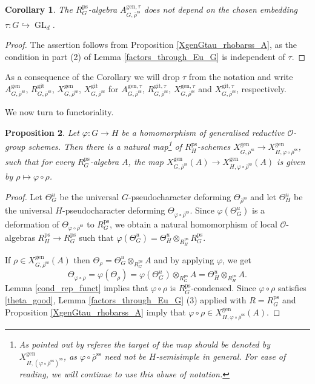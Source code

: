 \documentclass{amsart}
\newtheorem{prop}{Proposition}[section]
\newtheorem{cor}[prop]{Corollary}
\theoremstyle{definition}
\theoremstyle{remark}
\DeclareMathOperator{\GL}{GL}
\newcommand{\OO}{\mathcal O}
\newcommand{\rhobar}{\overline{\rho}}
\newcommand{\ps}{\mathrm{ps}}
\newcommand{\gen}{\mathrm{gen}}
\newcommand{\gps}{\mathrm{git}}
\newcommand{\RpsG}{R^{\ps}_G}
\newcommand{\RpsH}{R^{\ps}_H}
\newcommand{\XgenGrhobarss}{X^{\gen}_{G,\rhobarss}}
\newcommand{\XgenGtaurhobarss}{X^{\gen, \tau}_{G,\rhobarss}}
\newcommand{\rhobarss}{\rhobar^{\mathrm{ss}}}
\begin{document}
\begin{cor}\label{indep_tau} The $\RpsG$-algebra $A^{\gen, \tau}_{G, \rhobarss}$  does not depend on the chosen embedding $\tau: G\hookrightarrow \GL_d$.
\end{cor} 
\begin{proof} The assertion follows from Proposition \ref{XgenGtau_rhobarss_A}, as the condition 
in part (2) of Lemma \ref{factors_through_Eu_G} is independent of $\tau$. 
\end{proof}

 As a consequence of the Corollary we will drop $\tau$ from the notation and write $A^{\gen}_{G, \rhobarss}$, $R^{\gps}_{G, \rhobarss}$,
 $\XgenGrhobarss$, $X^{\gps}_{G, \rhobarss}$ 
 for $A^{\gen,\tau}_{G, \rhobarss}$, $R^{\gps,\tau}_{G, \rhobarss}$, $\XgenGtaurhobarss$ and $X^{\gps,\tau}_{G, \rhobarss}$, respectively.

We now turn to functoriality.

\begin{prop}\label{functoriality_2}
    Let $\varphi : G \to H$ be a homomorphism of generalised reductive $\OO$-group schemes.
    Then there is a natural map\footnote{As pointed out by referee the target of the map should be denoted by $X^{\gen}_{H, (\varphi \circ \rhobarss)^{\mathrm{ss}}}$, as $\varphi\circ \rhobarss$ need not be $H$-semisimple in general. For ease of reading, we will continue to use this abuse of notation.} of $\RpsH$-schemes $\XgenGrhobarss \to X^{\gen}_{H, \varphi \circ \rhobarss}$, such that for every $\RpsG$-algebra $A$, the map $\XgenGrhobarss(A) \to X^{\gen}_{H, \varphi \circ \rhobarss}(A)$ is given by $\rho \mapsto \varphi \circ \rho$.
\end{prop}

\begin{proof} Let $\Theta^u_G$ be the universal $G$-pseudocharacter deforming $\Theta_{\rhobarss}$
and let $\Theta^u_H$ be the universal $H$-pseudocharacter deforming $\Theta_{\varphi\circ\rhobarss}$. 
Since $\varphi(\Theta_G^u)$ is a deformation of $\Theta_{\varphi\circ\rhobarss}$ to $R^{\ps}_G$, we obtain a natural homomorphism of local $\OO$-algebras $R^{\ps}_H \rightarrow R^{\ps}_G$ such that 
$\varphi(\Theta^u_G)= \Theta^u_H \otimes_{R^{\ps}_H} R^{\ps}_G$. 
    
    If $\rho \in \XgenGrhobarss(A)$ then $\Theta_{\rho}= \Theta^u_G \otimes_{R^{\ps}_G} A $ and
    by applying $\varphi$, we get
    \begin{equation}\label{theta_good}
    \Theta_{\varphi \circ \rho}= \varphi(\Theta_{\rho})=\varphi(\Theta^u_G)\otimes_{\RpsG} A =
    \Theta^u_H\otimes_{\RpsH} A.
    \end{equation}
 Lemma \ref{cond_rep_funct} implies that $\varphi\circ \rho$ is $\RpsG$-condensed. Since
 $\varphi\circ \rho$ satisfies \eqref{theta_good}, Lemma \ref{factors_through_Eu_G} (3) applied with $R=\RpsG$ and Proposition \ref{XgenGtau_rhobarss_A}
 imply that $\varphi\circ \rho\in X^{\gen}_{H, \varphi\circ \rhobarss}(A)$.
\end{proof}
\end{document}
